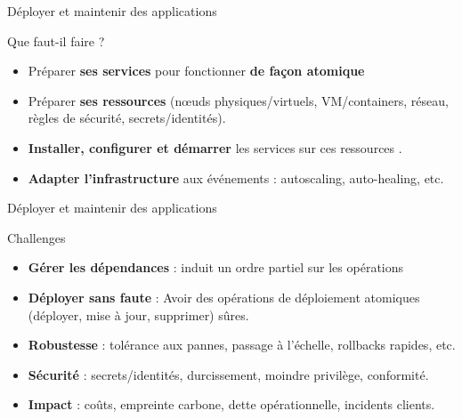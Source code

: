 \documentclass[aspectratio=169,10pt]{beamer}
\begin{document}

\begin{frame}{Déployer et maintenir des applications}

\begin{alertblock}{Que faut-il faire ?}
  \begin{itemize}
    \item Préparer \textbf{ses services} pour fonctionner \textbf{de façon atomique}
    \item Préparer \textbf{ses ressources} (n\oe uds physiques/virtuels, VM/containers, 
          réseau, règles de sécurité, secrets/identités).
    \item \textbf{Installer, configurer et démarrer} les services sur ces ressources .
    \item \textbf{Adapter l’infrastructure} aux événements : autoscaling, auto-healing, etc.
  \end{itemize}
\end{alertblock}

\end{frame}

\begin{frame}{Déployer et maintenir des applications}

\begin{alertblock}{Challenges}
  \begin{itemize}
    \item \textbf{Gérer les dépendances} : induit un ordre partiel sur les opérations
    \item \textbf{Déployer sans faute} : Avoir des opérations de déploiement atomiques (déployer, mise à jour, supprimer) sûres.
    \item \textbf{Robustesse} : tolérance aux pannes, passage à l'échelle, rollbacks rapides, etc.
    \item \textbf{Sécurité} : secrets/identités, durcissement, moindre privilège, conformité.
    \item \textbf{Impact} : coûts, empreinte carbone, dette opérationnelle, incidents clients.
  \end{itemize}
\end{alertblock}

\end{frame}


\end{document}
